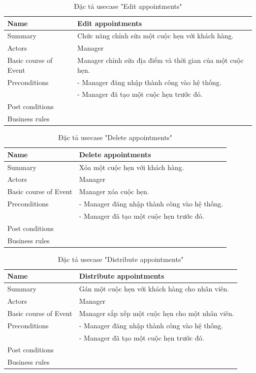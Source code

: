\documentclass[a4paper]{article}
\begin{document}
\begin{table}[!h]
    \centering
    \begin{tabular}{|m{3.2cm}|m{10.5cm}|}
        \hline
        Name & Edit appointments\\
        \hline
        Summary & Chức năng chỉnh sửa một cuộc hẹn với khách hàng.\\
        \hline
        Actors & Manager\\
        \hline
        Basic course of Event & Manager chỉnh sửa địa điểm và thời gian của một cuộc hẹn.\\
        \hline
        Preconditions &-	Manager đăng nhập thành công vào hệ thống.\\
&-	Manager đã tạo một cuộc hẹn trước đó.\\
        \hline
        Post conditions & \\
        \hline
        Business rules & \\
        \hline
    \end{tabular}
    \caption{Đặc tả usecase "Edit appointments"}
\end{table}
\begin{table}[!h]
    \centering
    \begin{tabular}{|m{3.2cm}|m{10.5cm}|}
        \hline
        Name & Delete appointments\\
        \hline
        Summary & Xóa một cuộc hẹn với khách hàng.\\
        \hline
        Actors & Manager\\
        \hline
        Basic course of Event & Manager xóa cuộc hẹn.\\
        \hline
        Preconditions &-	Manager đăng nhập thành công vào hệ thống.\\
&-	Manager đã tạo một cuộc hẹn trước đó.\\
        \hline
        Post conditions & \\
        \hline
        Business rules & \\
        \hline
    \end{tabular}
    \caption{Đặc tả usecase "Delete appointments"}
\end{table}
\begin{table}[!h]
    \centering
    \begin{tabular}{|m{3.2cm}|m{10.5cm}|}
        \hline
        Name & Distribute appointments\\
        \hline
        Summary & Gán một cuộc hẹn với khách hàng cho nhân viên.\\
        \hline
        Actors & Manager\\
        \hline
        Basic course of Event & Manager sắp xếp một cuộc hẹn cho một nhân viên.\\
        \hline
        Preconditions &-	Manager đăng nhập thành công vào hệ thống.\\
&-	Manager đã tạo một cuộc hẹn trước đó.\\
        \hline
        Post conditions & \\
        \hline
        Business rules & \\
        \hline
    \end{tabular}
    \caption{Đặc tả usecase "Distribute appointments"}
\end{table}
\end{document}
